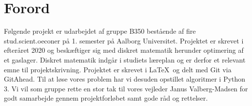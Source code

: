\chapter{Forord}
Følgende projekt er udarbejdet af gruppe B350 bestående af fire stud.scient.oeconer på 1. semester på Aalborg Universitet. Projektet er skrevet i efteråret 2020 og beskæftiger sig med diskret matematik herunder optimering af et gaslager. Diskret matematik indgår i studiets læreplan og er derfor et relevant emne til projektskrivning. Projektet er skrevet i \LaTeX \ og delt med Git via GitAhead. Til at løse vores problem har vi desuden opstillet algoritmer i Python 3.
Vi vil som gruppe rette en stor tak til vores vejleder Janus Valberg-Madsen for godt samarbejde gennem projektforløbet samt gode råd og rettelser.